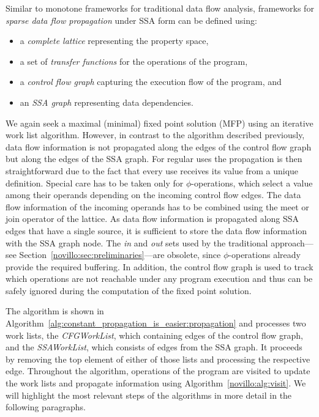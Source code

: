Similar to monotone frameworks for traditional data flow analysis, frameworks
for \emph{sparse data flow propagation} under SSA form can be defined using:
\begin{itemize}
  \item a \emph{complete lattice} representing the property space,
  \item a set of \emph{transfer functions} for the operations of the program,
  \item a \emph{control flow graph} capturing the execution flow of the program, and
  \item an \emph{SSA graph} representing data dependencies.
\end{itemize}
We again seek a maximal (minimal) fixed point solution (MFP) using an iterative
work list
algorithm. However, in contrast to the algorithm described previously, data flow
information is not propagated along the edges of the control flow graph but
along the edges of the SSA graph. For regular uses the propagation is then
straightforward due
to the fact that every use receives its value from a unique definition. Special
care has to be taken only for $\phi$-operations, which select a value among
their operands depending on the incoming control flow edges. The data flow
information of the
incoming operands has to be combined using the meet or join operator of the
lattice. As data flow information is propagated along SSA edges that have a
single source, it is sufficient to store the data flow information with the SSA
graph
node. The \emph{in} and \emph{out} sets used by the traditional approach---see
Section~\ref{novillo:sec:preliminaries}---are obsolete, since
$\phi$-operations already provide the required buffering.
In addition, the
control flow graph is used to track which operations are not reachable under any
program execution and thus can be safely ignored during the computation of the
fixed point solution.

\medskip

The algorithm is shown in 
Algorithm~\ref{alg:constant_propagation_is_easier:propagation} and
processes two work lists, the \emph{CFGWorkList}, which containing edges
of the control flow graph, and the \emph{SSAWorkList}, which consists of edges
from the SSA graph.
It proceeds by removing the top element of either of those lists and
processing the respective edge.
Throughout the algorithm, operations of
the program are visited to update the work lists and propagate
information using Algorithm~\ref{novillo:alg:visit}. We will highlight
the most relevant steps of the algorithms in more detail in the following
paragraphs.

